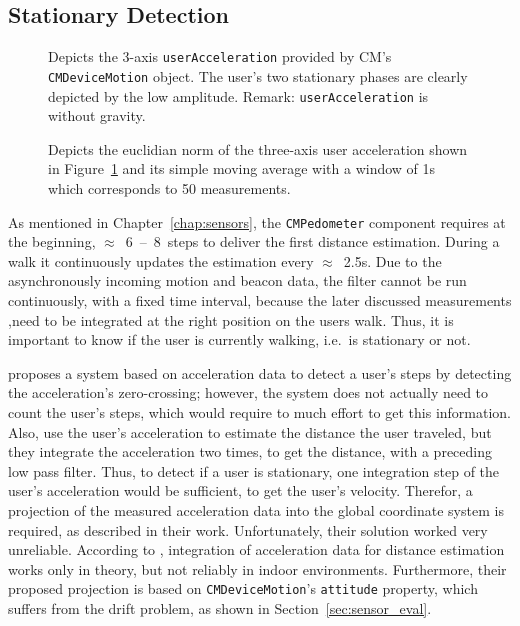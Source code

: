 \subsection{Stationary Detection}\label{sec:algo_stationary}

\begin{figure}
	
	\caption{Depicts the 3-axis \texttt{userAcceleration} provided by \acs{CM}'s \texttt{CMDeviceMotion} object. The user's two stationary phases are clearly depicted by the low amplitude. Remark: \texttt{userAcceleration} is without gravity.}
	\label{fig:mm_stationary_1}
\end{figure}

\begin{figure}
	
	\caption{Depicts the euclidian norm of the three-axis user acceleration shown in Figure~\ref{fig:mm_stationary_1} and its simple moving average with a window of 1s which corresponds to 50 measurements.}
	\label{fig:mm_stationary_2}
\end{figure}

As mentioned in Chapter~\ref{chap:sensors}, the \texttt{CMPedometer} component requires at the beginning, $\approx$~6~--~8~steps to deliver the first distance estimation. During a walk it continuously updates the estimation every $\approx$~2.5s. Due to the asynchronously incoming motion and beacon data, the filter cannot be run continuously, with a fixed time interval, because the later discussed measurements ,need to be integrated at the right position on the users walk. Thus, it is important to know if the user is currently walking, i.e.\ is stationary or not.

\citet{wang:wlan} proposes a system based on acceleration data to detect a user's steps by detecting the acceleration's zero-crossing; however, the system does not actually need to count the user's steps, which would require to much effort to get this information. Also,\citet{shanklin:embedded_sensors} use the user's acceleration to estimate the distance the user traveled, but they integrate the acceleration two times, to get the distance, with a preceding low pass filter. Thus, to detect if a user is stationary, one integration step of the user's acceleration would be sufficient, to get the user's velocity. Therefor, a projection of the measured acceleration data into the global coordinate system is required, as described in their work. Unfortunately, their solution worked very unreliable. According to \citet{wang:wlan}, integration of acceleration data for distance estimation works only in theory, but not reliably in indoor environments. Furthermore, their proposed projection is based on \texttt{CMDeviceMotion}'s \texttt{attitude} property, which suffers from the drift problem, as shown in Section~\ref{sec:sensor_eval}.

